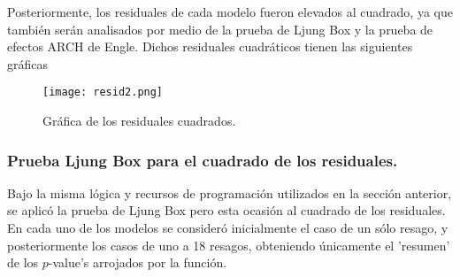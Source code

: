 \documentclass{article}
\theoremstyle{remark}
\begin{document}
Posteriormente, los residuales de cada modelo fueron elevados al cuadrado, ya que también serán analisados por medio de la prueba de Ljung Box y la prueba de efectos ARCH de Engle.
Dichos residuales cuadráticos tienen las siguientes gráficas
\begin{figure}[H]
    \centering
    \texttt{[image: resid2.png]}
    \caption{Gráfica de los residuales cuadrados.}
    \label{fig:RESID2}
\end{figure}

\subsubsection{Prueba Ljung Box para el cuadrado de los residuales.} 

Bajo la misma lógica y recursos  de programación utilizados en la sección anterior, se aplicó la prueba de Ljung Box pero esta ocasión al cuadrado de los residuales.\\

En cada uno de los modelos se consideró inicialmente el caso de un sólo resago, y posteriormente los casos de uno a 18 resagos, obteniendo únicamente el 'resumen' de los $p$-value's arrojados por la función.
\end{document}
